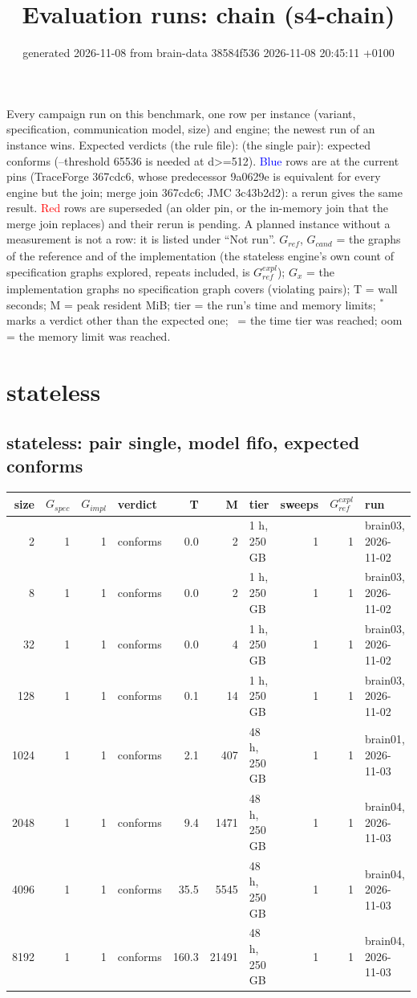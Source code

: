 \documentclass[10pt]{article}
\title{Evaluation runs: \textsf{chain} (s4-chain)}
\author{}
\date{generated 2026-11-08 from brain-data 38584f536 2026-11-08 20:45:11 +0100}
\begin{document}
\maketitle\small
\noindent Every campaign run on this benchmark, one row per instance (variant, specification, communication model, size) and engine; the newest run of an instance wins. Expected verdicts (the rule file): (the single pair): expected conforms (--threshold 65536 is needed at d>=512). \textcolor{blue}{Blue} rows are at the current pins (TraceForge 367cdc6, whose predecessor 9a0629e is equivalent for every engine but the join; merge join 367cdc6; JMC 3c43b2d2): a rerun gives the same result. \textcolor{red}{Red} rows are superseded (an older pin, or the in-memory join that the merge join replaces) and their rerun is pending. A planned instance without a measurement is not a row: it is listed under ``Not run''. $G_{\mathit{ref}}$, $G_{\mathit{cand}}$ = the graphs of the reference and of the implementation (the stateless engine's own count of specification graphs explored, repeats included, is $G_{\mathit{ref}}^{\mathit{expl}}$); $G_x$ = the implementation graphs no specification graph covers (violating pairs); T = wall seconds; M = peak resident MiB; tier = the run's time and memory limits; $^{\ast}$ marks a verdict other than the expected one; \faClock\ = the time tier was reached; oom = the memory limit was reached.

\section*{stateless}
\subsection*{stateless: pair \textsf{single}, model fifo, expected conforms}
\begin{longtable}{@{}rrrlrrlrrl@{}}
\toprule
size & $G_{\mathit{spec}}$ & $G_{\mathit{impl}}$ & verdict & T & M & tier & sweeps & $G_{\mathit{ref}}^{\mathit{expl}}$ & run \\
\midrule
\endhead
\color{blue} 2 & 1 & 1 & conforms & 0.0 & 2 & 1 h, 250 GB & 1 & 1 & brain03, 2026-11-02 \\
\color{blue} 8 & 1 & 1 & conforms & 0.0 & 2 & 1 h, 250 GB & 1 & 1 & brain03, 2026-11-02 \\
\color{blue} 32 & 1 & 1 & conforms & 0.0 & 4 & 1 h, 250 GB & 1 & 1 & brain03, 2026-11-02 \\
\color{blue} 128 & 1 & 1 & conforms & 0.1 & 14 & 1 h, 250 GB & 1 & 1 & brain03, 2026-11-02 \\
\color{blue} 1024 & 1 & 1 & conforms & 2.1 & 407 & 48 h, 250 GB & 1 & 1 & brain01, 2026-11-03 \\
\color{blue} 2048 & 1 & 1 & conforms & 9.4 & 1471 & 48 h, 250 GB & 1 & 1 & brain04, 2026-11-03 \\
\color{blue} 4096 & 1 & 1 & conforms & 35.5 & 5545 & 48 h, 250 GB & 1 & 1 & brain04, 2026-11-03 \\
\color{blue} 8192 & 1 & 1 & conforms & 160.3 & 21491 & 48 h, 250 GB & 1 & 1 & brain04, 2026-11-03 \\
\bottomrule
\end{longtable}
\end{document}
